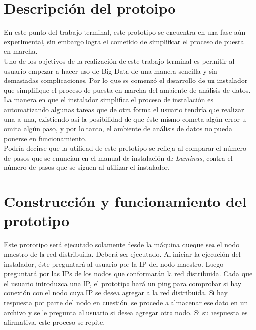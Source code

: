 \section{Descripción del protoipo}
En este punto del trabajo terminal, este prototipo se encuentra en una fase aún experimental, sin embargo logra el 
cometido de simplificar el proceso de puesta en marcha.\\

Uno de los objetivos de la realización de este trabajo terminal es permitir al usuario empezar a hacer uso de Big Data de una manera sencilla y sin demasiadas complicaciones. Por lo que se comenzó el desarrollo de un instalador que simplifique el proceso de puesta en marcha del ambiente de análisis de datos.\\

La manera en que el instalador simplifica el proceso de instalación es automatizando algunas tareas que de otra forma el usuario tendría que realizar una a una, existiendo así la posibilidad de que éste mismo cometa algún error u omita algún paso, y por lo tanto, el ambiente de análisis de datos no pueda ponerse en funcionamiento.\\

Podría decirse que la utilidad de este prototipo se refleja al comparar el número de pasos que se enuncian en el manual de instalación de \emph{Luminus}, contra el número de pasos que se siguen al utilizar el instalador.\\

\section{Construcción y funcionamiento del prototipo}
Este prorotipo será ejecutado solamente desde la máquina queque sea el nodo maestro de la red distribuida. Deberá ser ejecutado. Al iniciar la ejecución del instalador, éste preguntará al usuario por la IP del nodo maestro. Luego preguntará por las IPs de los nodos que conformarán la red distribuida. Cada que el usuario introduzca una IP, el prototipo hará un ping para comprobar si hay conexión con el nodo cuya IP se desea agregar a la red distribuida. Si hay respuesta por parte del nodo en cuestión, se procede a almacenar ese dato en un archivo y se le pregunta al usuario si desea agregar otro nodo. Si su respuesta es afirmativa, este proceso se repite. 

